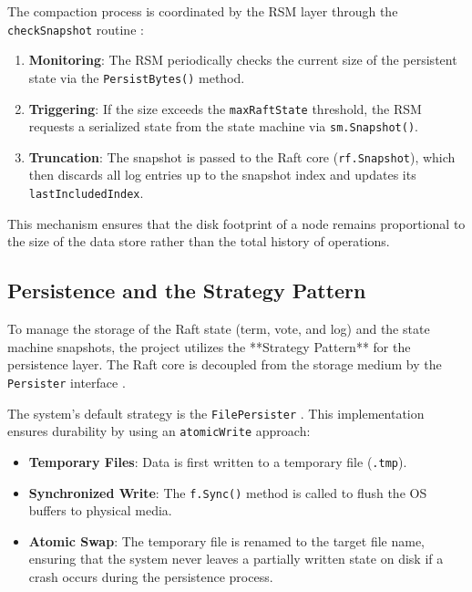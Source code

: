 The compaction process is coordinated by the RSM layer through the \texttt{checkSnapshot} routine \cite{rsm_go}:
\begin{enumerate}
    \item \textbf{Monitoring}: The RSM periodically checks the current size of the persistent state via the \texttt{PersistBytes()} method.
    \item \textbf{Triggering}: If the size exceeds the \texttt{maxRaftState} threshold, the RSM requests a serialized state from the state machine via \texttt{sm.Snapshot()}.
    \item \textbf{Truncation}: The snapshot is passed to the Raft core (\texttt{rf.Snapshot}), which then discards all log entries up to the snapshot index and updates its \texttt{lastIncludedIndex}.
\end{enumerate}



This mechanism ensures that the disk footprint of a node remains proportional to the size of the data store rather than the total history of operations.

\subsection{Persistence and the Strategy Pattern}
To manage the storage of the Raft state (term, vote, and log) and the state machine snapshots, the project utilizes the **Strategy Pattern** for the persistence layer. The Raft core is decoupled from the storage medium by the \texttt{Persister} interface \cite{raftapi_go}.

The system's default strategy is the \texttt{FilePersister} \cite{disk_persister_go}. This implementation ensures durability by using an \texttt{atomicWrite} approach:
\begin{itemize}
    \item \textbf{Temporary Files}: Data is first written to a temporary file (\texttt{.tmp}).
    \item \textbf{Synchronized Write}: The \texttt{f.Sync()} method is called to flush the OS buffers to physical media.
    \item \textbf{Atomic Swap}: The temporary file is renamed to the target file name, ensuring that the system never leaves a partially written state on disk if a crash occurs during the persistence process.
\end{itemize}